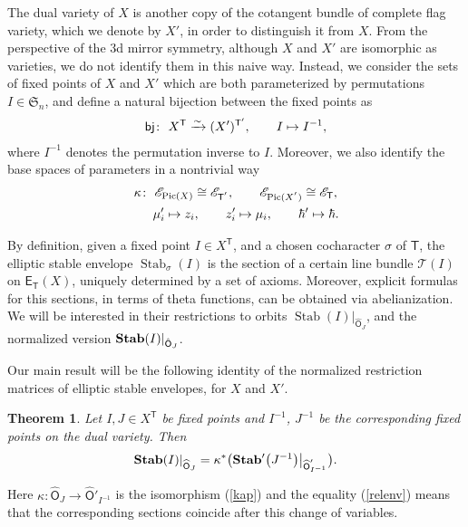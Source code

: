 \documentclass[pdftex]{sigma}
\DeclareMathOperator\Stab{Stab}
\newcommand{\bT}{\mathsf{T}}
\newcommand{\Or}{\textsf{O}}
\newcommand{\cE}{\mathscr{E}}
\numberwithin{equation}{section}
\newtheorem{Theorem}{Theorem}[section]
\begin{document}
The dual variety of $X$ is another copy of the cotangent bundle of complete flag variety, which we denote by $X'$, in order to distinguish it from $X$. From the perspective of the 3d mirror symmetry, although $X$ and $X'$ are isomorphic as varieties, we do not identify them in this naive way. Instead, we consider the sets of fixed points of $X$ and $X'$ which are both parameterized by permutations $I \in \mathfrak{S}_n$, and define a natural bijection between the fixed points as
\begin{gather*}
{\sf bj}\colon \ X^\bT \xrightarrow{\sim} (X')^{\bT'}, \qquad I \mapsto I^{-1},
\end{gather*}
where $I^{-1}$ denotes the permutation inverse to $I$. Moreover, we also identify the base spaces of parameters in a nontrivial way
\begin{gather} \label{kap}
\kappa\colon \ \cE_{{\rm Pic}(X)}\cong \cE_{\bT^{'}}, \qquad \cE_{{\rm Pic}(X^{'})}\cong \cE_{\bT},
\\
\hphantom{\kappa\colon}{} \ \mu'_i \mapsto z_i, \qquad z'_i \mapsto \mu_i, \qquad \hbar' \mapsto \hbar.\nonumber
\end{gather}

By definition, given a fixed point $I\in X^\bT$, and a chosen cocharacter $\sigma$ of $\bT$, the elliptic stable envelope $\Stab_\sigma (I)$ is the section of a certain line bundle $\mathcal{T} (I)$ on $\textsf{E}_\bT (X)$, uniquely determined by a set of axioms. Moreover, explicit formulas for this sections, in terms of theta functions, can be obtained via abelianization. We will be interested in their restrictions to orbits $\Stab (I)|_{\hat{\Or}_{J}}$, and the normalized version ${\bf Stab}(I)|_{\hat{\Or}_{J}}$.

Our main result will be the following identity of the normalized restriction matrices of elliptic stable envelopes, for $X$ and $X'$.

\begin{Theorem} \label{introthm} Let $I,J \in X^{\bT}$ be fixed points and $I^{-1}$, $J^{-1}$ be the corresponding fixed points on the dual variety. Then
 \begin{gather} \label{relenv}
 {\bf Stab}(I)|_{\widehat{\Or}_{J}}=\kappa^{*}\big( {\bf Stab}'\big(J^{-1}\big)\big|_{\widehat{\Or}'_{I^{-1}}}\big).
 \end{gather}
\end{Theorem}
Here $\kappa\colon \widehat{\Or}_{J} \rightarrow \widehat{\Or}'_{I^{-1}}$ is the isomorphism (\ref{kap}) and the equality (\ref{relenv}) means that the corresponding sections coincide after this change of variables.
\end{document}
